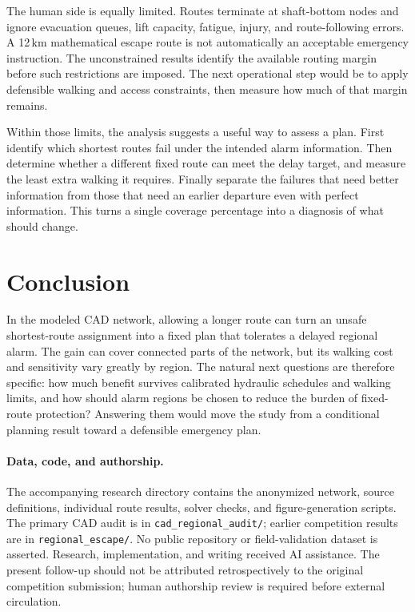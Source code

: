 \documentclass[11pt,a4paper]{article}
\begin{document}
The human side is equally limited. Routes terminate at shaft-bottom nodes and ignore evacuation queues, lift capacity, fatigue, injury, and route-following errors. A 12\,km mathematical escape route is not automatically an acceptable emergency instruction. The unconstrained results identify the available routing margin before such restrictions are imposed. The next operational step would be to apply defensible walking and access constraints, then measure how much of that margin remains.

Within those limits, the analysis suggests a useful way to assess a plan. First identify which shortest routes fail under the intended alarm information. Then determine whether a different fixed route can meet the delay target, and measure the least extra walking it requires. Finally separate the failures that need better information from those that need an earlier departure even with perfect information. This turns a single coverage percentage into a diagnosis of what should change.

\section{Conclusion}
In the modeled CAD network, allowing a longer route can turn an unsafe shortest-route assignment into a fixed plan that tolerates a delayed regional alarm. The gain can cover connected parts of the network, but its walking cost and sensitivity vary greatly by region. The natural next questions are therefore specific: how much benefit survives calibrated hydraulic schedules and walking limits, and how should alarm regions be chosen to reduce the burden of fixed-route protection? Answering them would move the study from a conditional planning result toward a defensible emergency plan.

\paragraph{Data, code, and authorship.}
The accompanying research directory contains the anonymized network, source definitions, individual route results, solver checks, and figure-generation scripts. The primary CAD audit is in \texttt{cad\_regional\_audit/}; earlier competition results are in \texttt{regional\_escape/}. No public repository or field-validation dataset is asserted. Research, implementation, and writing received AI assistance. The present follow-up should not be attributed retrospectively to the original competition submission; human authorship review is required before external circulation.
\end{document}
